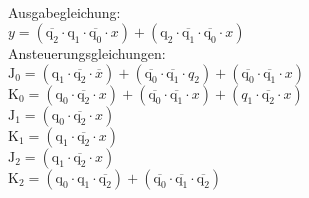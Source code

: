 \documentclass{scrartcl}
\newcommand{\ind}[1]{\ensuremath{\mathrm{#1}}}
\begin{document}
	\subsection{}
	\phantom{xxxx\\}

	 Ausgabegleichung:\\  

	 $y = \left(\overline{\ind{q_2}} \cdot \ind{q_1} \cdot \overline{\ind{q_0}} \cdot x\right) + \left(\ind{q_2} \cdot \overline{\ind{q_1}} \cdot \overline{\ind{q_0}} \cdot x\right)$\\

	 Ansteuerungsgleichungen:\\ 

	 $\ind{J_0} = (\ind{q_1} \cdot \overline{\ind{q_2}} \cdot \overline{x}) + (\overline{\ind{q_0}} \cdot \overline{\ind{q_1}} \cdot {q_2}) + (\overline{\ind{q_0}} \cdot \overline{\ind{q_1}} \cdot x)$\\

	 $\ind{K_0} = (\ind{q_0} \cdot \overline{\ind{q_2}} \cdot x) + (\overline{\ind{q_0}} \cdot \overline{\ind{q_1}} \cdot x) + ({q_1} \cdot \overline{\ind{q_2}} \cdot x)$\\
	 
	 $\ind{J_1} = (\ind{q_0} \cdot \overline{\ind{q_2}} \cdot x)$\\
	 
	 $\ind{K_1} = (\ind{q_1} \cdot \overline{\ind{q_2}} \cdot x)$ \\

	 $\ind{J_2} = (\ind{q_1} \cdot \overline{\ind{q_2}} \cdot x)$\\
	 
	 $\ind{K_2} = (\ind{q_0} \cdot \ind{q_1} \cdot \overline{\ind{q_2}}) + (\overline{\ind{q_0}} \cdot \overline{\ind{q_1}} \cdot \overline{\ind{q_2}})$\\~\\





\end{document}
